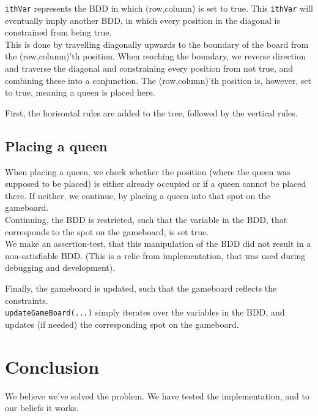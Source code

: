 \texttt{ithVar} represents the BDD in which (row,column) is set to true. This \texttt{ithVar} will eventually imply another BDD, in which every position in the diagonal is constrained from being true. \\
This is done by travelling diagonally upwards to the boundary of the board from the (row,column)'th position. When reaching the boundary, we reverse direction and traverse the diagonal and constraining every position from not true, and combining these into a conjunction. The  (row,column)'th position is, however, set to true, meaning a queen is placed here.


First, the horisontal rules are added to the tree, followed by the vertical rules. 

\subsection{Placing a queen}
When placing a queen, we check whether the position (where the queen was supposed to be placed) is either already occupied or if a queen cannot be placed there. If neither, we continue, by placing a queen into that spot on the gameboard. \\

Continuing, the BDD is restricted, such that the variable in the BDD, that corresponds to the spot on the gameboard, is set true. \\

We make an assertion-test, that this manipulation of the BDD did not result in a non-satisfiable BDD. (This is a relic from implementation, that was used during debugging and development). 

Finally, the gameboard is updated, such that the gameboard reflects the constraints. \\

\texttt{updateGameBoard(...)} simply iterates over the variables in the BDD, and updates (if needed) the corresponding spot on the gameboard. 

\section{Conclusion}
We believe we've solved the problem. We have tested the implementation, and to our beliefs it works. 